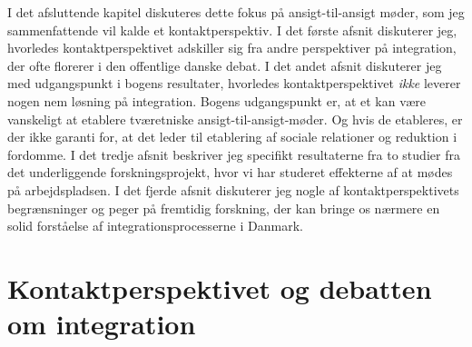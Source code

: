 \documentclass[
]{book}
\begin{document}
I det afsluttende kapitel diskuteres dette fokus på ansigt-til-ansigt møder, som jeg sammenfattende vil kalde et kontaktperspektiv. I det første afsnit diskuterer jeg, hvorledes kontaktperspektivet adskiller sig fra andre perspektiver på integration, der ofte florerer i den offentlige danske debat. I det andet afsnit diskuterer jeg med udgangspunkt i bogens resultater, hvorledes kontaktperspektivet \emph{ikke} leverer nogen nem løsning på integration. Bogens udgangspunkt er, at et kan være vanskeligt at etablere tværetniske ansigt-til-ansigt-møder. Og hvis de etableres, er der ikke garanti for, at det leder til etablering af sociale relationer og reduktion i fordomme. I det tredje afsnit beskriver jeg specifikt resultaterne fra to studier fra det underliggende forskningsprojekt, hvor vi har studeret effekterne af at mødes på arbejdspladsen. I det fjerde afsnit diskuterer jeg nogle af kontaktperspektivets begrænsninger og peger på fremtidig forskning, der kan bringe os nærmere en solid forståelse af integrationsprocesserne i Danmark.

\section{Kontaktperspektivet og debatten om integration}\label{kontaktperspektivet-og-debatten-om-integration}
\end{document}
